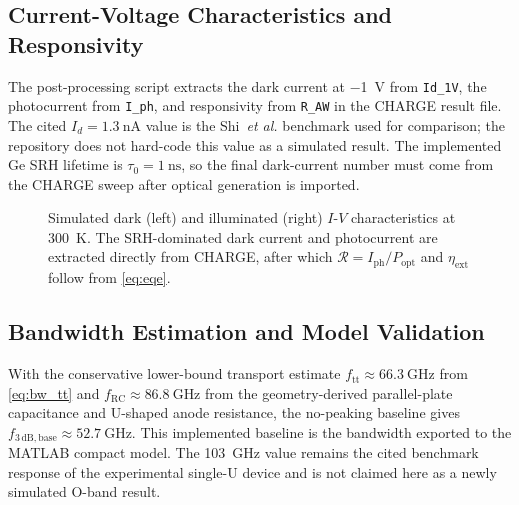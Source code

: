 \subsection[Current-Voltage Characteristics]{Current-Voltage Characteristics and Responsivity}
\label{subsec:pd_iv_results}

The post-processing script extracts the dark current at \SI{-1}{\volt} from
\texttt{Id\_1V}, the photocurrent from \texttt{I\_ph}, and responsivity from
\texttt{R\_AW} in the CHARGE result file. The cited
$I_d=\SI{1.3}{\nano\ampere}$ value is the Shi~\textit{et al.} benchmark used for
comparison; the repository does not hard-code this value as a simulated result.
The implemented Ge SRH lifetime is $\tau_0=\SI{1}{\nano\second}$, so the final
dark-current number must come from the CHARGE sweep after optical generation is
imported.

\begin{figure}[H]
    \centering
    \caption{Simulated dark (left) and illuminated (right) $I$-$V$ characteristics
    at \SI{300}{\kelvin}. The SRH-dominated dark current and photocurrent are
    extracted directly from CHARGE, after which
    $\mathcal{R}=I_{\mathrm{ph}}/P_{\mathrm{opt}}$ and
    $\eta_{\mathrm{ext}}$ follow from \cref{eq:eqe}.}
    \label{fig:iv_results}
\end{figure}

\subsection{Bandwidth Estimation and Model Validation}
\label{subsec:pd_bw_results}

With the conservative lower-bound transport estimate
$f_{\mathrm{tt}}\approx\SI{66.3}{\giga\hertz}$ from \cref{eq:bw_tt} and
$f_{\mathrm{RC}}\approx\SI{86.8}{\giga\hertz}$ from the geometry-derived
parallel-plate capacitance and U-shaped anode resistance, the no-peaking
baseline gives
$f_{3\,\mathrm{dB,base}}\approx\SI{52.7}{\giga\hertz}$. This implemented
baseline is the bandwidth exported to the MATLAB compact model. The
\SI{103}{\giga\hertz} value remains the cited benchmark response of the
experimental single-U device and is not claimed here as a newly simulated O-band
result.

